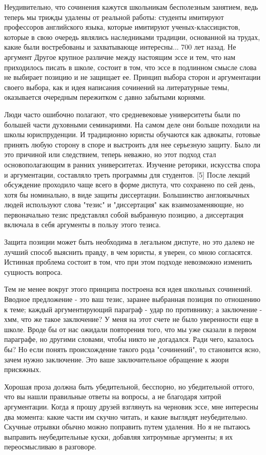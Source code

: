 \documentclass[ebook,12pt,oneside,openany]{memoir}
\begin{document}
Неудивительно, что сочинения кажутся школьникам бесполезным занятием,
ведь теперь мы трижды удалены от реальной работы: студенты имитируют
профессоров английского языка, которые имитируют ученых-классицистов,
которые в свою очередь являлись наследниками традиции, основанной на
трудах, какие были востребованы и захватывающе интересны... 700 лет
назад. Не аргумент Другое крупное различие между настоящим эссе и тем,
что нам приходилось писать в школе, состоит в том, что эссе в
подлинном смысле слова не выбирает позицию и не защищает ее. Принцип
выбора сторон и аргументации своего выбора, как и идея написания
сочинений на литературные темы, оказывается очередным пережитком с
давно забытыми корнями.

Люди часто ошибочно полагают, что средневековые университеты были по
большей части духовными семинариями. На самом деле они больше походили
на школы юриспруденции. И традиционно юристы обучаются как адвокаты,
готовые принять любую сторону в споре и выстроить для нее серьезную
защиту. Было ли это причиной или следствием, теперь неважно, но этот
подход стал основополагающим в ранних университетах. Изучение
реторики, искусства спора и аргументации, составляло треть программы
для студентов. [5] После лекций обсуждение проходило чаще всего в
форме диспута, что сохранено по сей день, хотя бы номинально, в виде
защиты диссертации. Большинство англоязычных людей используют слова
"тезис" и "диссертация" как взаимозаменяющие, но первоначально тезис
представлял собой выбранную позицию, а диссертация включала в себя
аргументы в пользу этого тезиса.

Защита позиции может быть необходима в легальном диспуте, но это
далеко не лучший способ выяснить правду, в чем юристы, я уверен, со
мною согласятся. Истинная проблема состоит в том, что при этом подходе
невозможно изменить сущность вопроса.

Тем не менее вокруг этого принципа построена вся идея школьных
сочинений. Вводное предложение - это ваш тезис, заранее выбранная
позиция по отношению к теме; каждый аргументирующий параграф - удар по
противнику; а заключение - хмм, что же такое заключение? У меня на
этот счете не было уверенности еще в школе. Вроде бы от нас ожидали
повторения того, что мы уже сказали в первом параграфе, но другими
словами, чтобы никто не догадался. Ради чего, казалось бы? Но если
понять происхождение такого рода "сочинений", то становится ясно,
зачем нужно заключение. Это ваше заключительное обращение к жюри
присяжных.

Хорошая проза должна быть убедительной, бесспорно, но убедительной
оттого, что вы нашли правильные ответы на вопросы, а не благодаря
хитрой аргументации. Когда я прошу друзей взглянуть на черновик эссе,
мне интересны два момента: какие части им скучно читать, и какие
выглядят неубедительно. Скучные отрывки обычно можно поправить путем
удаления. Но я не пытаюсь выправить неубедительные куски, добавляя
хитроумные аргументы; я их переосмысливаю в разговоре.
\end{document}
